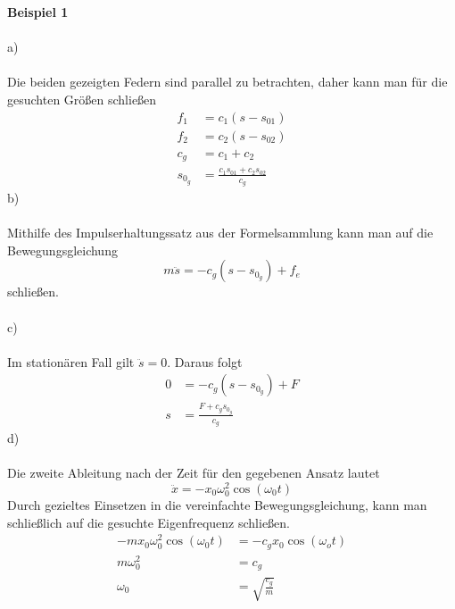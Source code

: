 \textbf{Beispiel 1}\\ \\
a)\\ \\
Die beiden gezeigten Federn sind parallel zu betrachten, daher kann man für die gesuchten Größen schließen
\begin{align*}
	f_1 &= c_1(s - s_{01}) \\
	f_2 &= c_2(s - s_{02}) \\
	c_g &= c_1 + c_2 \\
	s_{0_g} &= \frac{c_1s_{01} + c_2s_{02}}{c_g}
\end{align*}
b)\\ \\
Mithilfe des Impulserhaltungssatz aus der Formelsammlung kann man auf die Bewegungsgleichung
\[
	m\ddot{s} = -c_g(s - s_{0_g}) + f_e
\]
schließen.\\ \\
c)\\ \\
Im stationären Fall gilt $\ddot{s} = 0$. Daraus folgt
\begin{align*}
	0 &= -c_g(s - s_{0_g}) + F \\
	s &= \frac{F + c_gs_{0_g}}{c_g}
\end{align*}
d)\\ \\
Die zweite Ableitung nach der Zeit für den gegebenen Ansatz lautet
\[
	\ddot{x} = - x_0\omega^2_0 \cos(\omega_0 t)
\]
Durch gezieltes Einsetzen in die vereinfachte Bewegungsgleichung, kann man schließlich auf die gesuchte Eigenfrequenz schließen.
\begin{align*}
	-m x_0\omega^2_0 \cos(\omega_0 t) &= -c_g x_0\cos(\omega_o t) \\
	m \omega_0^2 &= c_g \\
	\omega_0 &= \sqrt{\frac{c_g}{m}}
\end{align*}